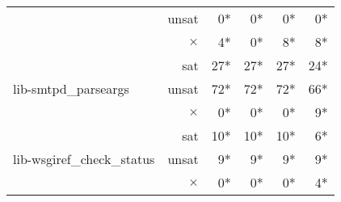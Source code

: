 \begin{table}[t]
{\begin{tabular}{l r | r r r r}
							& unsat    &  0*  & 0* & 0* &  0* \\
							& $\times$ &  4*  &  0* &  8* & 8* \\ \hline
\multirow{3}{*}{lib-smtpd\_parseargs}	& sat & 27*  &  27* &  27* &  24* \\ 
							& unsat    &  72*  & 72* & 72* &  66* \\
							& $\times$ &  0*  &  0* &  0* & 9* \\ \hline
\multirow{3}{*}{lib-wsgiref\_check\_status}	& sat & 10*  &  10* &  10* &  6* \\ 
							& unsat    &  9*  & 9* & 9* &  9* \\
							& $\times$ &  0*  &  0* &  0* & 4* \\ \hline
\end{tabular}}
\label{table:str_int_benchmark}
\end{table}


